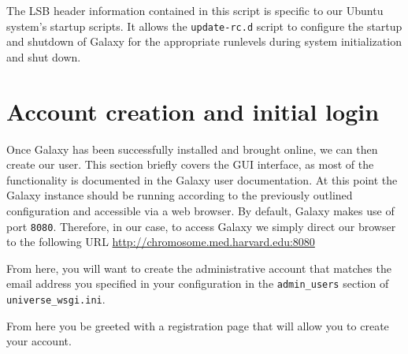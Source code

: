 \documentclass[a4paper,10pt]{article}
\begin{document}
The LSB header information contained in this script is specific to our Ubuntu system's startup scripts.  It allows the \texttt{\footnotesize{update-rc.d}} script to configure the startup and shutdown of Galaxy for the appropriate runlevels during system initialization and shut down.

\section{Account creation and initial login}
Once Galaxy has been successfully installed and brought online, we can then create our user.  This section briefly covers the GUI interface, as most of the functionality is documented in the Galaxy user documentation.
At this point the Galaxy instance should be running according to the previously outlined configuration and accessible via a web browser.
By default, Galaxy makes use of port \texttt{\footnotesize{8080}}. Therefore, in our case, to access Galaxy we simply direct our browser to the following URL \href{http://chromosome.med.harvard.edu:8080}{http://chromosome.med.harvard.edu:8080}

From here, you will want to create the administrative account that matches the email address you specified in your configuration in the \texttt{\footnotesize{admin\_users}} section of \texttt{\footnotesize{universe\_wsgi.ini}}.\vspace{1em}\\
\setlength\fboxsep{0pt}\vspace{1em}

From here you be greeted with a registration page that will allow you to create your account.\vspace{1em}
\setlength\fboxsep{0pt}\vspace{1em}
\end{document}
